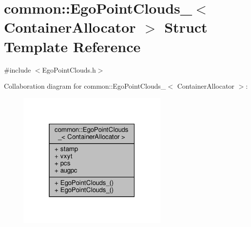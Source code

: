 \hypertarget{structcommon_1_1EgoPointClouds__}{}\section{common\+:\+:Ego\+Point\+Clouds\+\_\+$<$ Container\+Allocator $>$ Struct Template Reference}
\label{structcommon_1_1EgoPointClouds__}


{\ttfamily \#include $<$Ego\+Point\+Clouds.\+h$>$}



Collaboration diagram for common\+:\+:Ego\+Point\+Clouds\+\_\+$<$ Container\+Allocator $>$\+:\nopagebreak
\begin{figure}[H]
\begin{center}
\leavevmode
\includegraphics[width=211pt]{d0/d67/structcommon_1_1EgoPointClouds____coll__graph}
\end{center}
\end{figure}
